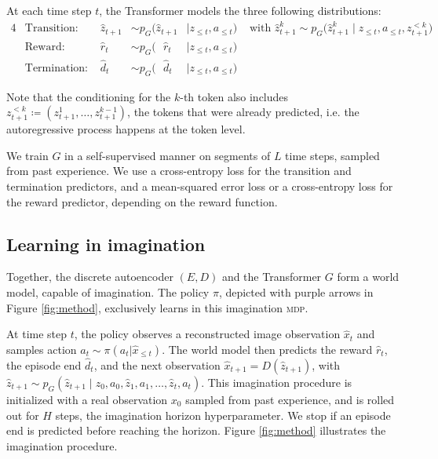 At each time step $t$, the Transformer models the three following distributions: 
\begin{alignat}{4}
& \text{Transition: }   &   \hat{z}_{t+1}         &   \sim p_G\big(     \hat{z}_{t+1}  &  \mid z_{\le t}, a_{\le t} \big) & \text{ with } \hat{z}_{t+1}^k \sim p_G\big(\hat{z}_{t+1}^k \mid z_{\le t}, a_{\le t}, z_{t+1}^{<k} \big)\\
& \text{Reward: }       &   \hat{r}_t \text{~~}   &   \sim p_G\big(\text{~~} \hat{r}_t &  \mid z_{\le t}, a_{\le t} \big) & \\
& \text{Termination: }  &   \hat{d}_t \text{~~}   &   \sim p_G\big(\text{~~} \hat{d}_t &  \mid z_{\le t}, a_{\le t} \big) & 
\end{alignat}

Note that the conditioning for the $k$-th token also includes $z_{t+1}^{<k} \coloneqq (z_{t+1}^1, \dots, z_{t+1}^{k-1})$, the tokens that were already predicted, i.e. the autoregressive process happens at the token level.

We train $G$ in a self-supervised manner on segments of $L$ time steps, sampled from past experience. We use a cross-entropy loss for the transition and termination predictors, and a mean-squared error loss or a cross-entropy loss for the reward predictor, depending on the reward function.

\subsection{Learning in imagination}
\label{section:learn_in_imagination}



Together, the discrete autoencoder $(E,D)$ and the Transformer $G$ form a world model, capable of imagination. The policy $\pi$, depicted with purple arrows in Figure \ref{fig:method}, exclusively learns in this imagination \textsc{mdp}. 

At time step $t$, the policy observes a reconstructed image observation $\hat{x}_t$ and samples action $a_t \sim \pi(a_t | \hat{x}_{\le t})$. The world model then predicts the reward $\hat{r}_t$, the episode end $\hat{d}_t$, and the next observation $\hat{x}_{t+1} = D(\hat{z}_{t+1})$, with $\hat{z}_{t+1} \sim p_G(\hat{z}_{t+1} \mid z_0, a_0, \hat{z}_1, a_1, \dots, \hat{z}_t, a_t)$. This imagination procedure is initialized with a real observation $x_0$ sampled from past experience, and is rolled out for $H$ steps, the imagination horizon hyperparameter. We stop if an episode end is predicted before reaching the horizon. Figure \ref{fig:method} illustrates the imagination procedure.

